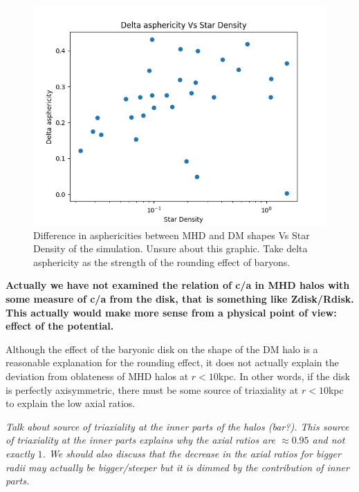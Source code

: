 \documentclass[a4paper,fleqn,usenatbib]{mnras}
\begin{document}
\begin{figure}
  \includegraphics[width=\columnwidth]{./pics/Delta asphericity Vs Star Density.png}
  \caption{Difference in asphericities between MHD and DM shapes Vs
    Star Density of the simulation. Unsure about this graphic. Take
    delta asphericity as the strength of the rounding effect of
    baryons.}  
  \label{fig:Star_Density_effect}
\end{figure}

\textbf{Actually we have not examined the relation of c/a in MHD halos
  with some measure of c/a from the disk, that is something like
  Zdisk/Rdisk. This actually would make more sense from a physical
  point of view: effect of the potential.} 

Although the effect of the baryonic disk on the shape of the DM halo
is a reasonable explanation for the rounding effect, it does not
actually explain the deviation from oblateness of MHD halos at
$r<10$kpc. In other words, if the disk is perfectly axisymmetric,
there must be some source of triaxiality at $r<10$kpc to explain the
low axial ratios. 

\textit{ Talk about source of triaxiality at the inner parts of the
  halos (bar?). This source of triaxiality at the inner parts explains
  why the axial ratios are $\approx 0.95$ and not exactly $1$. We
  should also discuss that the decrease in the axial ratios for bigger
  radii may actually be bigger/steeper but it is dimmed by the
  contribution of inner parts.} 
%
\end{document}
